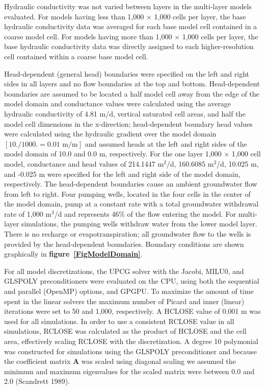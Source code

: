 \documentclass[12pt]{article}
\begin{document}
Hydraulic conductivity was not varied between layers in the multi-layer models evaluated. For models having less than 1,000 $\times$ 1,000 cells per layer, the base hydraulic conductivity data was averaged for each base model cell contained in a coarse model cell. For models having more than 1,000 $\times$ 1,000 cells per layer, the base hydraulic conductivity data was directly assigned to each higher-resolution cell contained within a coarse base model cell.

Head-dependent (general head) boundaries were specified on the left and right sides \color{cyan} in all layers \color{black} and no flow boundaries at the top and bottom. Head-dependent boundaries are assumed to be located a half model cell away from the edge of the model domain and conductance values were calculated using the average hydraulic conductivity of 4.81 m/d, vertical saturated cell areas, and half the model cell dimensions in the x-direction; head-dependent boundary head values were calculated using the hydraulic gradient over the model domain \color{blue}$\left [ 10. / 1000. = 0.01 \text{ m/m} \right]$ \color{black}and assumed heads at the left and right sides of the model domain of 10.0 and 0.0 m, respectively. For the one layer 1,000 $\times$ 1,000 cell model, conductance and head values of 214.1447 m$^{2}$/d, 160.6085 m$^{2}$/d, 10.025 m, and -0.025 m were specified for the left and right side of the model domain, respectively. The head-dependent boundaries cause an ambient groundwater flow from left to right. Four pumping wells, located in the four cells in the center of the model domain, pump at a constant rate with a total groundwater withdrawal rate of 1,000 m$^3$/d \color{cyan}and represents 46\% of the flow entering the model\color{black}. For multi-layer simulations, the pumping wells withdraw water from the lower model layer. There is no recharge or evapotranspiration; all groundwater flow to the wells is provided by the head-dependent boundaries. Boundary conditions are shown graphically in \textbf{figure~\ref{FigModelDomain}}.

For all model discretizations, the UPCG solver with the Jacobi, MILU0, and GLSPOLY preconditioners were evaluated on the CPU, using both the sequential and parallel (OpenMP) options, and GPGPU. To maximize the amount of time spent in the linear solvers the maximum number of Picard and inner (linear) iterations were set to 50 and 1,000, respectively. A HCLOSE value of 0.001 m was used for all simulations. In order to use a consistent RCLOSE value in all simulations, RCLOSE was calculated as the product of HCLOSE and the cell area, effectively scaling RCLOSE with the discretization. A degree 10 polymonial was constructed for simulations using the GLSPOLY preconditioner and because the coefficient matrix $\mathbf{A}$ was scaled using diagonal scaling we assumed the minimum and maximum eigenvalues for the scaled matrix were between 0.0 and 2.0 (Scandrett 1989).
\end{document}
